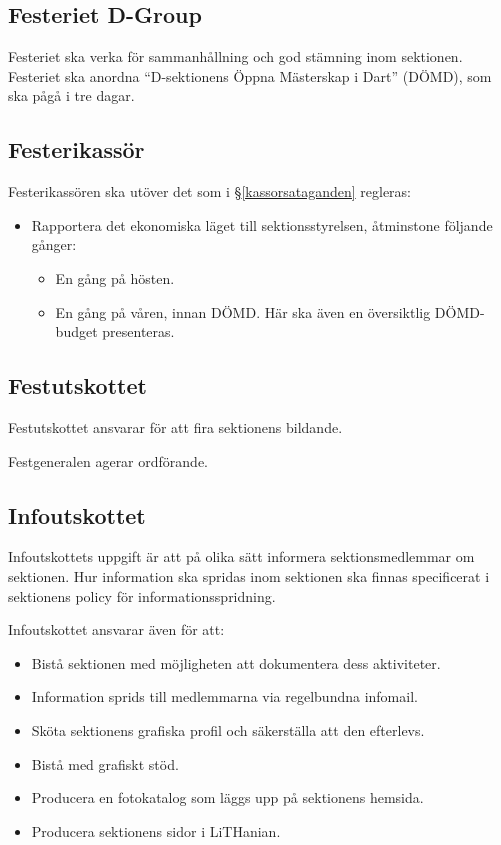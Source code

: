 \documentclass{datateknologsektionen-document}
\begin{document}
\subsection{Festeriet D-Group}
Festeriet ska verka för sammanhållning och god stämning inom sektionen. Festeriet ska
anordna ``D-sektionens Öppna Mästerskap i Dart'' (DÖMD), som ska pågå i tre dagar.

\subsection{Festerikassör}
Festerikassören ska utöver det som i \S \ref{kassorsataganden} regleras:
\begin{itemize}
  \item Rapportera det ekonomiska läget till sektionsstyrelsen, åtminstone följande gånger:
        \begin{itemize}
          \item En gång på hösten.
          \item En gång på våren, innan DÖMD. Här ska även en översiktlig DÖMD-budget presenteras.
        \end{itemize}
\end{itemize}

\subsection{Festutskottet}
Festutskottet ansvarar för att fira sektionens bildande.

Festgeneralen agerar ordförande.

\subsection{Infoutskottet}
\label{infoutskottet}
Infoutskottets uppgift är att på olika sätt informera sektionsmedlemmar om sektionen.
Hur information ska spridas inom sektionen ska finnas specificerat i sektionens
policy för informationsspridning.

Infoutskottet ansvarar även för att:
\begin{itemize}
  \item Bistå sektionen med möjligheten att dokumentera dess aktiviteter.
  \item Information sprids till medlemmarna via regelbundna infomail.
  \item Sköta sektionens grafiska profil och säkerställa att den efterlevs.
  \item Bistå med grafiskt stöd.
  \item Producera en fotokatalog som läggs upp på sektionens hemsida.
  \item Producera sektionens sidor i LiTHanian.
\end{itemize}
\end{document}
